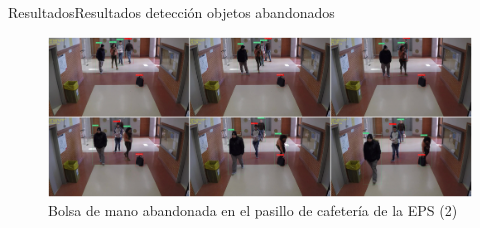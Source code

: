 
\begin{frame}{Resultados}{Resultados detección objetos abandonados}

\begin{figure}[ht]
\centering
\includegraphics[width=1\textwidth]{Images/resultados/evaluacion-algoritmos/2.png}
\caption{\label{fig:abandono-uah2}Bolsa de mano abandonada en el pasillo de cafetería de la EPS (2)}
\end{figure}

\end{frame}
